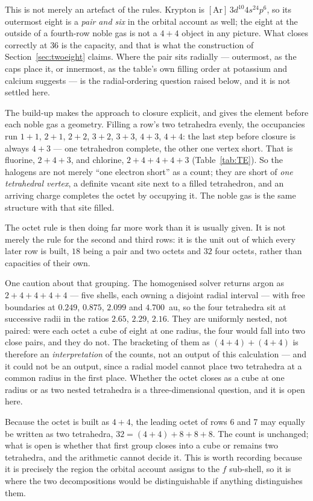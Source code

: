 \documentclass[11pt]{article}
\begin{document}
This is not merely an artefact of the rules. Krypton is $[\mathrm{Ar}]\,3d^{10}4s^24p^6$, so its
outermost eight is a \emph{pair and six} in the orbital account as well; the eight at the outside of
a fourth-row noble gas is not a $4{+}4$ object in any picture. What closes correctly at $36$ is the
capacity, and that is what the construction of Section~\ref{sec:twoeight} claims. Where the pair sits
radially --- outermost, as the caps place it, or innermost, as the table's own filling order at
potassium and calcium suggests --- is the radial-ordering question raised below, and it is not settled
here.

The build-up makes the approach to closure explicit, and gives the element before each noble gas a
geometry. Filling a row's two tetrahedra evenly, the occupancies run
$1{+}1$, $2{+}1$, $2{+}2$, $3{+}2$, $3{+}3$, $4{+}3$, $4{+}4$: the last step before closure is
always $4{+}3$ --- one tetrahedron complete, the other one vertex short. That is fluorine,
$2{+}4{+}3$, and chlorine, $2{+}4{+}4{+}4{+}3$ (Table~\ref{tab:TE}). So the halogens are not
merely ``one electron short'' as a count; they are short of \emph{one tetrahedral vertex}, a
definite vacant site next to a filled tetrahedron, and an arriving charge completes the octet by
occupying it. The noble gas is the same structure with that site filled.

The octet rule is then doing far more work than it is usually given. It is not merely the rule
for the second and third rows: it is the unit out of which every later row is built, $18$ being
a pair and two octets and $32$ four octets, rather than capacities of their own.

One caution about that grouping. The homogenised solver returns argon as
$2{+}4{+}4{+}4{+}4$ --- five shells, each owning a disjoint radial interval --- with free
boundaries at $0.249$, $0.875$, $2.099$ and $4.700$~au, so the four tetrahedra sit at
successive radii in the ratios $2.65$, $2.29$, $2.16$. They are uniformly nested, not paired:
were each octet a cube of eight at one radius, the four would fall into two close pairs, and
they do not. The bracketing of them as $(4{+}4)+(4{+}4)$ is therefore an \emph{interpretation}
of the counts, not an output of this calculation --- and it could not be an output, since a
radial model cannot place two tetrahedra at a common radius in the first place. Whether the
octet closes as a cube at one radius or as two nested tetrahedra is a three-dimensional
question, and it is open here.

Because the octet is built as $4{+}4$, the leading octet of rows 6 and 7 may equally be written
as two tetrahedra, $32=(4{+}4)+8+8+8$. The count is unchanged; what is open is whether that
first group closes into a cube or remains two tetrahedra, and the arithmetic cannot decide it.
This is worth recording because it is precisely the region the orbital account assigns to the
$f$ sub-shell, so it is where the two decompositions would be distinguishable if anything
distinguishes them.
\end{document}
